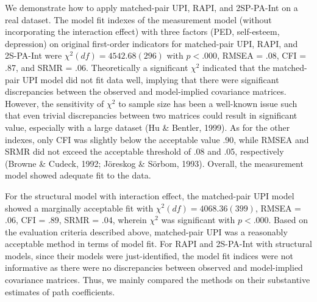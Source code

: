 \documentclass[
  man]{apa7}
\begin{document}
We demonstrate how to apply matched-pair UPI, RAPI, and 2SP-PA-Int on a real dataset. The model fit indexes of the measurement model (without incorporating the interaction effect) with three factors (PED, self-esteem, depression) on original first-order indicators for matched-pair UPI, RAPI, and 2S-PA-Int were \(\chi^2(df) = 4542.68(296)\) with \(\textit{p} < .000\), RMSEA = .08, CFI = .87, and SRMR = .06. Theoretically a significant \(\chi^2\) indicated that the matched-pair UPI model did not fit data well, implying that there were significant discrepancies between the observed and model-implied covariance matrices. However, the sensitivity of \(\chi^2\) to sample size has been a well-known issue such that even trivial discrepancies between two matrices could result in significant value, especially with a large dataset (Hu \& Bentler, 1999). As for the other indexes, only CFI was slightly below the acceptable value .90, while RMSEA and SRMR did not exceed the acceptable threshold of .08 and .05, respectively (Browne \& Cudeck, 1992; Jöreskog \& Sörbom, 1993). Overall, the measurement model showed adequate fit to the data.

For the structural model with interaction effect, the matched-pair UPI model showed a marginally acceptable fit with \(\chi^2(df) = 4068.36(399)\), RMSEA = .06, CFI = .89, SRMR = .04, wherein \(\chi^2\) was significant with \(\textit{p} < .000\). Based on the evaluation criteria described above, matched-pair UPI was a reasonably acceptable method in terms of model fit. For RAPI and 2S-PA-Int with structural models, since their models were just-identified, the model fit indices were not informative as there were no discrepancies between observed and model-implied covariance matrices. Thus, we mainly compared the methods on their substantive estimates of path coefficients.
\end{document}
